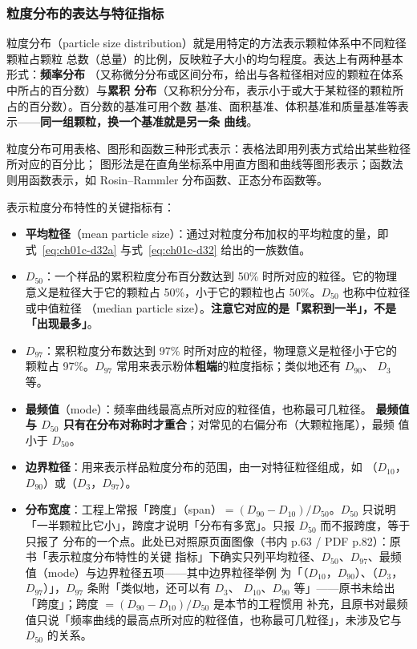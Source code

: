 \subsubsection{粒度分布的表达与特征指标}

粒度分布（particle size distribution）就是用特定的方法表示颗粒体系中不同粒径颗粒占颗粒
总数（总量）的比例，反映粒子大小的均匀程度。表达上有两种基本形式：\textbf{频率分布}
（又称微分分布或区间分布，给出与各粒径相对应的颗粒在体系中所占的百分数）与\textbf{累积
分布}（又称积分分布，表示小于或大于某粒径的颗粒所占的百分数）。百分数的基准可用个数
基准、面积基准、体积基准和质量基准等表示——\textbf{同一组颗粒，换一个基准就是另一条
曲线}。

粒度分布可用表格、图形和函数三种形式表示：表格法即用列表方式给出某些粒径所对应的百分比；
图形法是在直角坐标系中用直方图和曲线等图形表示；函数法则用函数表示，如
Rosin--Rammler 分布函数、正态分布函数等。

表示粒度分布特性的关键指标有：

\begin{itemize}
\item \textbf{平均粒径}（mean particle size）：通过对粒度分布加权的平均粒度的量，即
式~\eqref{eq:ch01c-d32a} 与式~\eqref{eq:ch01c-d32} 给出的一族数值。
\item \textbf{$D_{50}$}：一个样品的累积粒度分布百分数达到 50\% 时所对应的粒径。它的物理
意义是粒径大于它的颗粒占 50\%，小于它的颗粒也占 50\%。$D_{50}$ 也称中位粒径或中值粒径
（median particle size）。\textbf{注意它对应的是「累积到一半」，不是「出现最多」}。
\item \textbf{$D_{97}$}：累积粒度分布数达到 97\% 时所对应的粒径，物理意义是粒径小于它的
颗粒占 97\%。$D_{97}$ 常用来表示粉体\textbf{粗端}的粒度指标；类似地还有 $D_{90}$、
$D_{3}$ 等。
\item \textbf{最频值}（mode）：频率曲线最高点所对应的粒径值，也称最可几粒径。
\textbf{最频值与 $D_{50}$ 只有在分布对称时才重合}；对常见的右偏分布（大颗粒拖尾），最频
值小于 $D_{50}$。
\item \textbf{边界粒径}：用来表示样品粒度分布的范围，由一对特征粒径组成，如
（$D_{10}$，$D_{90}$）或（$D_{3}$，$D_{97}$）。
\item \textbf{分布宽度}：工程上常报「跨度」（span）$=(D_{90}-D_{10})/D_{50}$。$D_{50}$
只说明「一半颗粒比它小」，跨度才说明「分布有多宽」。只报 $D_{50}$ 而不报跨度，等于只报了
分布的一个点。此处已对照原页面图像（书内 p.63 / PDF p.82）：原书「表示粒度分布特性的关键
指标」下确实只列平均粒径、$D_{50}$、$D_{97}$、最频值（mode）与边界粒径五项——其中边界粒径举例
为「（$D_{10}$，$D_{90}$）、（$D_{3}$，$D_{97}$）」，$D_{97}$ 条附「类似地，还可以有 $D_{3}$、
$D_{10}$、$D_{90}$ 等」——原书未给出「跨度」；跨度 $=(D_{90}-D_{10})/D_{50}$ 是本节的工程惯用
补充，且原书对最频值只说「频率曲线的最高点所对应的粒径值，也称最可几粒径」，未涉及它与
$D_{50}$ 的关系。
\end{itemize}

